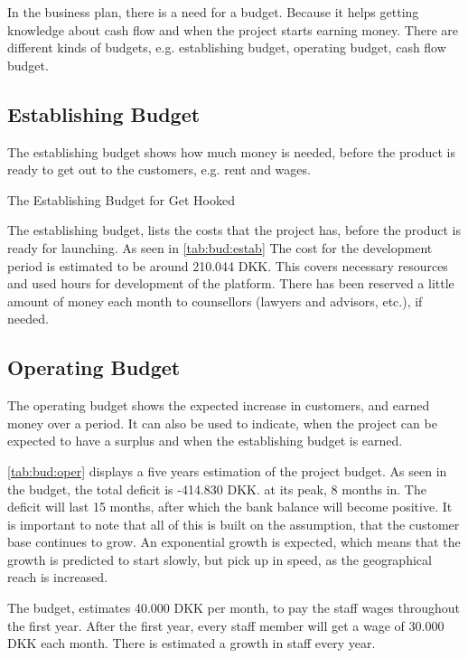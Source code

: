 In the business plan, there is a need for a budget. Because it helps getting knowledge about cash flow and when the project starts earning money. There are different kinds of budgets, e.g. establishing budget, operating budget, cash flow budget.


\subsection{Establishing Budget}
The establishing budget shows how much money is needed, before the product is ready to get out to the customers, e.g. rent and wages.


\begin{table}[H]
\centering
\caption{The Establishing Budget for Get Hooked}
\label{tab:bud:estab}

\end{table}

The establishing budget, lists the costs that the project has, before the product is ready for launching. As seen in \autoref{tab:bud:estab} The cost for the development period is estimated to be around 210.044 DKK. This covers necessary resources and used hours for development of the platform. There has been reserved a little amount of money each month to counsellors (lawyers and advisors, etc.), if needed.

\subsection{Operating Budget}

The operating budget shows the expected increase in customers, and earned money over a period. It can also be used to indicate, when the project can be expected to have a surplus and when the establishing budget is earned.

\autoref{tab:bud:oper} displays a five years estimation of the project budget. As seen in the budget, the total deficit is -414.830 DKK. at its peak, 8 months in. The deficit will last 15 months, after which the bank balance will become positive. It is important to note that all of this is built on the assumption, that the customer base continues to grow. An exponential  growth is expected, which means that the growth is predicted to start slowly, but pick up in speed, as the geographical reach is increased.

The budget, estimates 40.000 DKK per month, to pay the staff wages throughout the first year. After the first year, every staff member will get a wage of 30.000 DKK each month. There is estimated a growth in staff every year.

